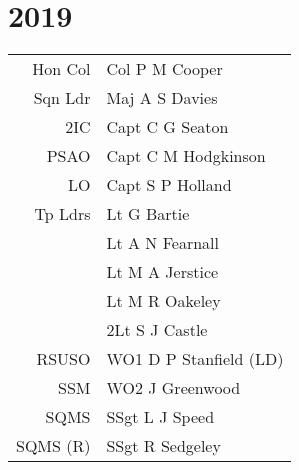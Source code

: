 \chapter*{2019}

\begin{center}
  \begin{tabular}{rl}
    Hon Col & Col P M Cooper \\
    Sqn Ldr & Maj A S Davies \\
    2IC & Capt C G Seaton \\
    PSAO & Capt C M Hodgkinson \\
    LO & Capt S P Holland \\
    Tp Ldrs & Lt G Bartie \\
     & Lt A N Fearnall \\
     & Lt M A Jerstice \\
     & Lt M R Oakeley \\
     & 2Lt S J Castle \\
    RSUSO & WO1 D P Stanfield (LD) \\
    SSM & WO2 J Greenwood \\
    SQMS & SSgt L J Speed \\
    SQMS (R) & SSgt R Sedgeley \\
  \end{tabular}
\end{center}

